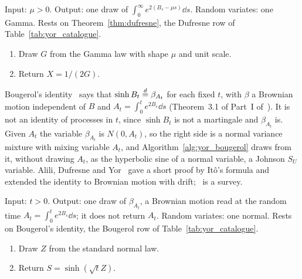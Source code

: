 \begin{samepage}
\begin{algorithm}\label{alg:yor_dufresne}
Input: $\mu>0$. Output: one draw of $\int_0^\infty e^{2(B_s-\mu s)}\dd s$. Random variates: one Gamma. Rests on Theorem~\ref{thm:dufresne}, the Dufresne row of Table~\ref{tab:yor_catalogue}.
\begin{enumerate}[nosep]
\item Draw $G$ from the Gamma law with shape $\mu$ and unit scale.
\item Return $X=1/(2G)$.
\end{enumerate}
\end{algorithm}
\end{samepage}

Bougerol's identity~\cite{bougerol1983} says that $\sinh B_t\stackrel{d}{=}\beta_{A_t}$ for each fixed $t$, with $\beta$ a Brownian motion independent of $B$ and $A_t=\int_0^te^{2B_s}\dd s$ (Theorem~3.1 of Part~I of~\cite{matsumotoyor2005}). It is not an identity of processes in $t$, since $\sinh B_t$ is not a martingale and $\beta_{A_t}$ is. Given $A_t$ the variable $\beta_{A_t}$ is $N(0,A_t)$, so the right side is a normal variance mixture with mixing variable $A_t$, and Algorithm~\ref{alg:yor_bougerol} draws from it, without drawing $A_t$, as the hyperbolic sine of a normal variable, a Johnson $S_U$ variable. Alili, Dufresne and Yor~\cite{alili1997} gave a short proof by It\^o's formula and extended the identity to Brownian motion with drift;~\cite{vakeroudis2012} is a survey.

\begin{samepage}
\begin{algorithm}\label{alg:yor_bougerol}
Input: $t>0$. Output: one draw of $\beta_{A_t}$, a Brownian motion read at the random time $A_t=\int_0^te^{2B_s}\dd s$; it does not return $A_t$. Random variates: one normal. Rests on Bougerol's identity, the Bougerol row of Table~\ref{tab:yor_catalogue}.
\begin{enumerate}[nosep]
\item Draw $Z$ from the standard normal law.
\item Return $S=\sinh(\sqrt tZ)$.
\end{enumerate}
\end{algorithm}
\end{samepage}

